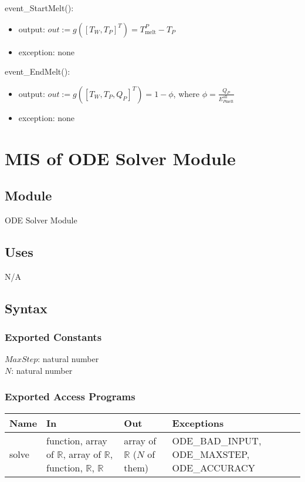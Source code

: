 \documentclass[12pt]{article}
\begin{document}
event\_StartMelt(): 
\begin{itemize}
\item output: $out := g([T_W, T_P]^T) = T_\text{melt}^P - T_P$
\item exception: none
\end{itemize}

event\_EndMelt(): 
\begin{itemize}
\item output: $out := g([T_W, T_P, Q_P]^T) = 1 - \phi$, where $\phi = \frac{Q_P}{E_{P\text{melt}}^{\text{all}}}$
\item exception: none
\end{itemize}

\newpage
\section{MIS of ODE Solver Module} \label{ODE}

\subsection{Module}

ODE Solver Module

\subsection{Uses}

N/A

\subsection{Syntax}

\subsubsection{Exported Constants}

$MaxStep$: natural number \\
$N$: natural number

\subsubsection{Exported Access Programs}

\begin{center}
\begin{tabular}{p{2cm} p{4cm} p{4cm} p{4cm}}
\hline
\textbf{Name} & \textbf{In} & \textbf{Out} & \textbf{Exceptions} \\
\hline
solve & function, array of $\mathbb{R}$, array of $\mathbb{R}$, function, $\mathbb{R}$, $\mathbb{R}$ & array of $\mathbb{R}$ ($N$ of them) & ODE\_BAD\_INPUT, ODE\_MAXSTEP, ODE\_ACCURACY \\
\hline 
\end{tabular}
\end{center}
\end{document}
